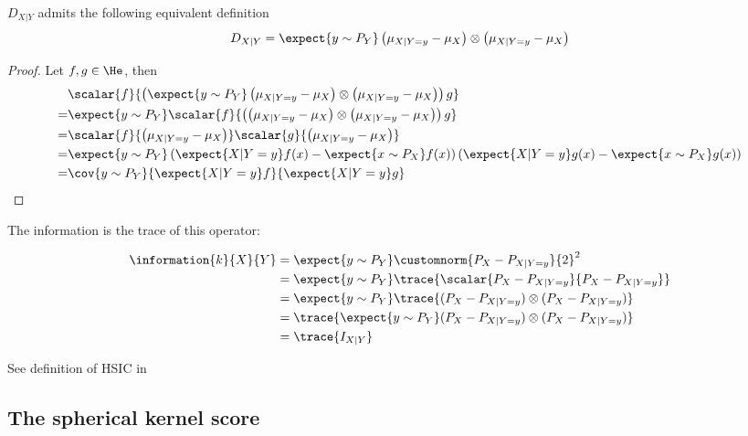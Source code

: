 \begin{statement}
$D_{X\vert Y}$ admits the following equivalent definition
\begin{align}
	D_{X\vert Y} = \expect{y\sim P_Y} \left(\mu_{X\vert Y=y} - \mu_{X}\right) \otimes \left(\mu_{X\vert Y=y}  - \mu_{X} \right)
\end{align}

\begin{proof}
Let $f,g\in\He$, then
\begin{align}
	&\scalar{f}{ \left(\expect{y\sim P_Y}\left(\mu_{X\vert Y=y} - \mu_{X}\right) \otimes \left(\mu_{X\vert Y=y}  - \mu_{X} \right)\right) g}\\
	=&\expect{y\sim P_Y}\scalar{f}{ \left(\left(\mu_{X\vert Y=y} - \mu_{X}\right) \otimes \left(\mu_{X\vert Y=y}  - \mu_{X} \right)\right) g}\\
	=& \scalar{f}{\left(\mu_{X\vert Y=y} - \mu_{X}\right)}\scalar{g}{\left(\mu_{X\vert Y=y} - \mu_{X}\right)}\\
	=& \expect{y\sim P_Y} \left(\expect{X\vert Y=y} f(x) - \expect{x\sim P_X}f(x)\right)\left(\expect{X\vert Y=y} g(x) - \expect{x\sim P_X}g(x)\right)\\
	=& \cov{y\sim P_Y}{\expect{X\vert Y=y} f}{\expect{X\vert Y=y} g}
\end{align}
\end{proof}
\end{statement}

The information is the trace of this operator:

\begin{align}
	\information{k}{X}{Y} &= \expect{y \sim P_{Y}} \customnorm{P_X - P_{X\vert Y=y}}{2}^2\\
		&= \expect{y \sim P_{Y}} \trace{\scalar{P_X - P_{X\vert Y=y}}{P_X - P_{X\vert Y=y}}}\\
		&= \expect{y \sim P_{Y}} \trace{ ( P_X - P_{X\vert Y=y}) \otimes (P_X - P_{X\vert Y=y})}\\
		&= \trace{ \expect{y \sim P_{Y}} ( P_X - P_{X\vert Y=y}) \otimes (P_X - P_{X\vert Y=y})} \\
		&= \trace{I_{X\vert Y}}
\end{align}

See definition of HSIC in \citep{GreBouSmoSch05.pdf}

\subsection{The spherical kernel score}


